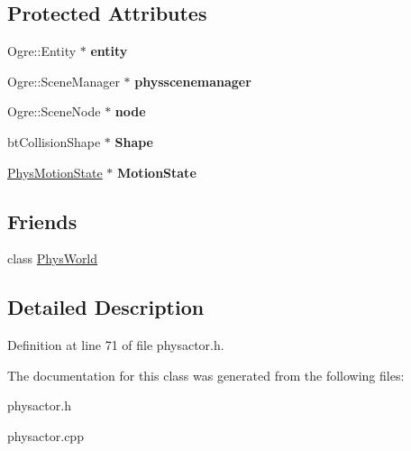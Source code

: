 \subsection*{Protected Attributes}
\begin{DoxyCompactItemize}
\item 
\hypertarget{classActorBase_ada6ceb752605b29357b6c5d53c477696}{
Ogre::Entity $\ast$ {\bfseries entity}}
\label{dd/d7b/classActorBase_ada6ceb752605b29357b6c5d53c477696}

\item 
\hypertarget{classActorBase_ad3739eb7f632f0ceb9397d6c699623cd}{
Ogre::SceneManager $\ast$ {\bfseries physscenemanager}}
\label{dd/d7b/classActorBase_ad3739eb7f632f0ceb9397d6c699623cd}

\item 
\hypertarget{classActorBase_affa8851ae622e1d420afa4770ab89ea4}{
Ogre::SceneNode $\ast$ {\bfseries node}}
\label{dd/d7b/classActorBase_affa8851ae622e1d420afa4770ab89ea4}

\item 
\hypertarget{classActorBase_aff0d385bc9d30cf053838fd61b32ebad}{
btCollisionShape $\ast$ {\bfseries Shape}}
\label{dd/d7b/classActorBase_aff0d385bc9d30cf053838fd61b32ebad}

\item 
\hypertarget{classActorBase_a4ae7c4fd3b9449771e1c1bbd09cf103e}{
\hyperlink{classPhysMotionState}{PhysMotionState} $\ast$ {\bfseries MotionState}}
\label{dd/d7b/classActorBase_a4ae7c4fd3b9449771e1c1bbd09cf103e}

\end{DoxyCompactItemize}
\subsection*{Friends}
\begin{DoxyCompactItemize}
\item 
\hypertarget{classActorBase_a375fd37c70c941f0442997a60fdb05c7}{
class \hyperlink{classActorBase_a375fd37c70c941f0442997a60fdb05c7}{PhysWorld}}
\label{dd/d7b/classActorBase_a375fd37c70c941f0442997a60fdb05c7}

\end{DoxyCompactItemize}


\subsection{Detailed Description}


Definition at line 71 of file physactor.h.

The documentation for this class was generated from the following files:\begin{DoxyCompactItemize}
\item 
physactor.h\item 
physactor.cpp\end{DoxyCompactItemize}

